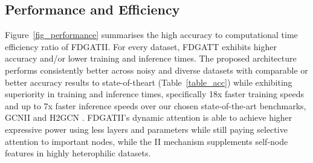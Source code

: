 \documentclass{article}
\begin{document}
\begin{table}[h]
\caption{Model accuracy with increasing layer depth shows no presence of over smoothing or suspended animation problem. We used a hidden dimension of 64 and Equation~\ref{eq-GCNII} variant for all tests.}
\end{table}

\begin{table}[h]
\caption{Model layers and variant of II used for provided results. All other parameters are identical to \citet{chen2020simple}.}
\end{table}

\subsection{Performance and Efficiency}
Figure~\ref{fig_performance} summarises the high accuracy to computational time efficiency ratio of FDGATII. For every dataset, FDGATT exhibits higher accuracy and/or lower training and inference times.  The proposed architecture performs consistently better across noisy and diverse datasets with comparable or better accuracy results to state-of-theart (Table~\ref{table_acc}) while exhibiting superiority in training and inference times, specifically 18x faster training speeds and up to 7x faster inference speeds over our chosen state-of-the-art benchmarks, GCNII \cite{chen2020simple} and H2GCN \cite{zhu2020beyond}. FDGATII's dynamic attention is able to achieve higher expressive power using less layers and parameters while still paying selective attention to important nodes, while the II mechanism supplements self-node features in highly heterophilic datasets. 
\end{document}
